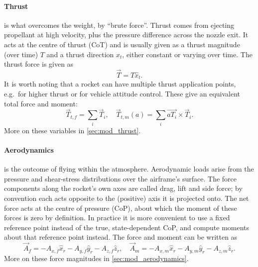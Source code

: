\paragraph{Thrust} is what overcomes the weight, by ``brute force''. Thrust comes from ejecting
propellant at high velocity, plus the pressure difference across the nozzle exit. It acts at the
centre of thrust (CoT) and is usually given as a thrust magnitude (over time) $T$ and a thrust
direction $\hat{x}_t$, either constant or varying over time. The thrust force is given as
\begin{equation}
    \vec{T} = T\hat{x}_t.
\end{equation}
It is worth noting that a rocket can have multiple thrust application points, e.g.\ for higher
thrust or for vehicle attitude control. These give an equivalent total force and moment:
\begin{equation}
    \vec{T}_{t, f} = \sum_i \vec{T}_i,\quad \vec{T}_{t, m}(a) = \sum_i \vec{aT_i}\times\vec{T}_i.
\end{equation}
More on these variables in \autoref{sec:mod_thrust}.

\paragraph{Aerodynamics} is the outcome of flying within the atmosphere. Aerodynamic loads arise
from the pressure and shear-stress distributions over the airframe's surface. The force components
along the rocket's own axes are called drag, lift and side force; by convention each acts opposite
to the (positive) axis it is projected onto. The net force acts at the centre of pressure (CoP),
about which the moment of these forces is zero by definition. In practice it is more convenient to
use a fixed reference point instead of the true, state-dependent CoP, and compute moments about
that reference point instead. The force and moment can be written as
\begin{equation}
    \vec{A}_f = -A_{x,f}\hat{x}_r -A_{y,f}\hat{y}_r -A_{z,f}\hat{z}_r,\quad
    \vec{A}_m = -A_{x,m}\hat{x}_r -A_{y,m}\hat{y}_r -A_{z,m}\hat{z}_r.
\end{equation}
More on these force magnitudes in \autoref{sec:mod_aerodynamics}.

